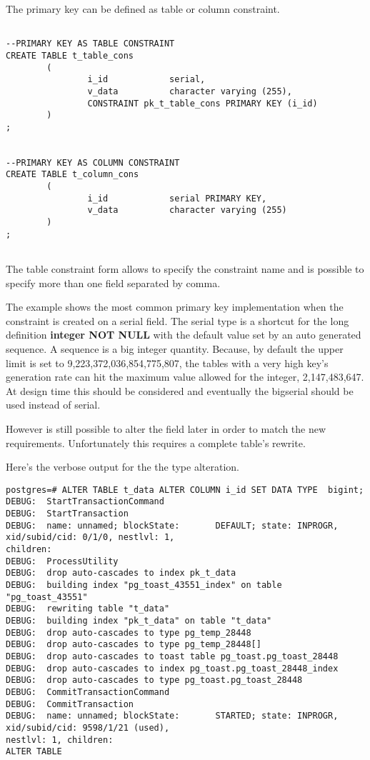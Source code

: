 The primary key can be defined as table or column constraint.\newpage

\begin{lstlisting}[style=pgsql]

--PRIMARY KEY AS TABLE CONSTRAINT
CREATE TABLE t_table_cons
        (
                i_id            serial,
                v_data          character varying (255),
                CONSTRAINT pk_t_table_cons PRIMARY KEY (i_id)
        )
;


--PRIMARY KEY AS COLUMN CONSTRAINT
CREATE TABLE t_column_cons
        (
                i_id            serial PRIMARY KEY,
                v_data          character varying (255)
        )
;
 

\end{lstlisting}

The table constraint form allows to specify the constraint name and is possible to specify more than
one field separated by comma.\newline

The example shows the most common primary key implementation when the constraint is created on a
serial field. The serial type is a shortcut for the long definition \textbf{integer
NOT NULL} with the default value set by an auto generated sequence. A sequence is a big integer
quantity. Because, by default the upper limit is set to 9,223,372,036,854,775,807, the tables with a
very high key's generation rate can hit the maximum value allowed for the integer, 2,147,483,647. At
design time this should be considered and eventually the bigserial should be used
instead of serial.\newline

However is still possible to alter the field later in order to match the new requirements. 
Unfortunately this requires a complete table's rewrite. \newline 

Here's the verbose output for the the type alteration.

\begin{lstlisting}[style=pgsql]
postgres=# ALTER TABLE t_data ALTER COLUMN i_id SET DATA TYPE  bigint; 
DEBUG:  StartTransactionCommand
DEBUG:  StartTransaction
DEBUG:  name: unnamed; blockState:       DEFAULT; state: INPROGR, xid/subid/cid: 0/1/0, nestlvl: 1, 
children: 
DEBUG:  ProcessUtility
DEBUG:  drop auto-cascades to index pk_t_data
DEBUG:  building index "pg_toast_43551_index" on table "pg_toast_43551"
DEBUG:  rewriting table "t_data"
DEBUG:  building index "pk_t_data" on table "t_data"
DEBUG:  drop auto-cascades to type pg_temp_28448
DEBUG:  drop auto-cascades to type pg_temp_28448[]
DEBUG:  drop auto-cascades to toast table pg_toast.pg_toast_28448
DEBUG:  drop auto-cascades to index pg_toast.pg_toast_28448_index
DEBUG:  drop auto-cascades to type pg_toast.pg_toast_28448
DEBUG:  CommitTransactionCommand
DEBUG:  CommitTransaction
DEBUG:  name: unnamed; blockState:       STARTED; state: INPROGR, xid/subid/cid: 9598/1/21 (used), 
nestlvl: 1, children: 
ALTER TABLE

\end{lstlisting}

